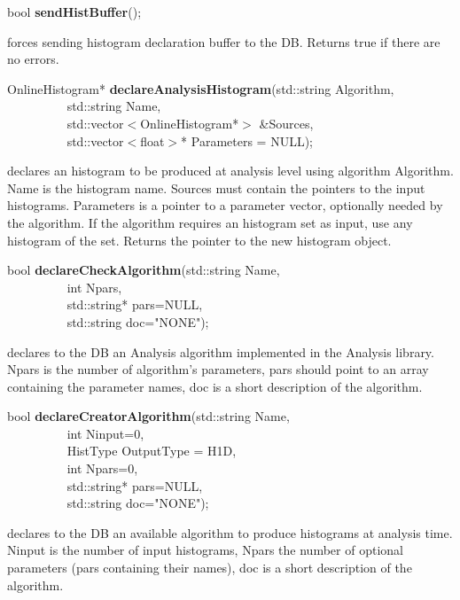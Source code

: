 \item    bool {\bf sendHistBuffer}();


 forces sending histogram declaration buffer to the DB. Returns true if there are no errors.


\item    OnlineHistogram* {\bf declareAnalysisHistogram}(std::string Algorithm,\\\mbox{}~~~~~~~~~
					    std::string Name,\\\mbox{}~~~~~~~~~
					    std::vector$<$OnlineHistogram*$>$ \&Sources,\\\mbox{}~~~~~~~~~
					    std::vector$<$float$>$* Parameters = NULL);

 declares an histogram to be produced at analysis
 level using algorithm Algorithm. Name is the histogram name. Sources
 must contain the pointers to the input histograms. Parameters is a
 pointer to a parameter vector, optionally needed by the algorithm. If
 the algorithm requires an histogram set as input, use any histogram of the
 set. Returns the pointer to the new histogram object.


\item    bool {\bf declareCheckAlgorithm}(std::string Name,\\\mbox{}~~~~~~~~~ 
			     int Npars,\\\mbox{}~~~~~~~~~ 
			     std::string* pars=NULL,\\\mbox{}~~~~~~~~~ 
			     std::string doc="NONE");

 declares to the DB an Analysis algorithm implemented in the Analysis
 library. Npars is the number of algorithm's parameters, pars should
 point to an array containing the parameter names, doc is a short
 description of the algorithm.


\item    bool {\bf declareCreatorAlgorithm}(std::string Name,\\\mbox{}~~~~~~~~~ 
			       int Ninput=0,\\\mbox{}~~~~~~~~~ 
			       HistType OutputType = H1D,\\\mbox{}~~~~~~~~~
			       int Npars=0,\\\mbox{}~~~~~~~~~ 
			       std::string* pars=NULL,\\\mbox{}~~~~~~~~~
			       std::string doc="NONE");

 declares to the DB an available algorithm to produce histograms at
 analysis time. Ninput is the number of input histograms, Npars the
 number of optional parameters (pars containing their names), doc is a short
 description of the algorithm.



